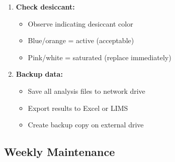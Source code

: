 \documentclass[11pt,a4paper]{article}\usepackage[]{graphicx}\usepackage[]{xcolor}
\begin{document}
\begin{enumerate}[noitemsep]
    \item \textbf{Check desiccant:}
    \begin{itemize}
        \item Observe indicating desiccant color
        \item Blue/orange = active (acceptable)
        \item Pink/white = saturated (replace immediately)
    \end{itemize}
    \item \textbf{Backup data:}
    \begin{itemize}
        \item Save all analysis files to network drive
        \item Export results to Excel or LIMS
        \item Create backup copy on external drive
    \end{itemize}
\end{enumerate}

\subsection{Weekly Maintenance}
\end{document}
